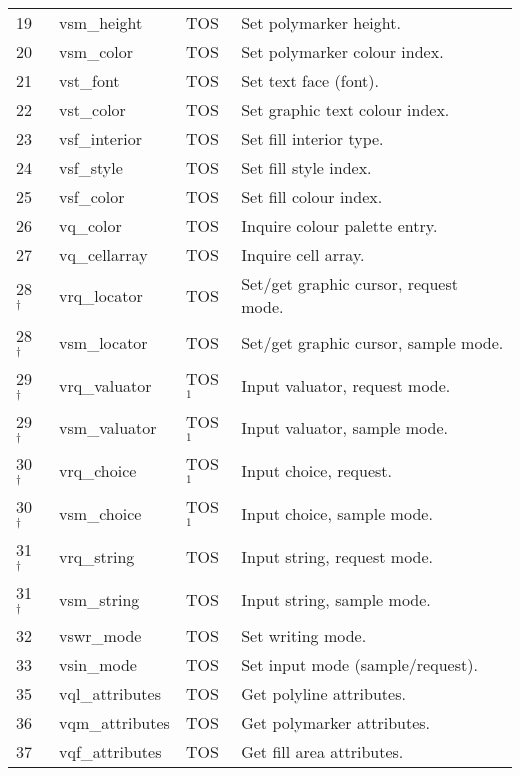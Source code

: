\documentclass[a4paper]{article}
\begin{document}
\begin{supertabular}{|p{1.8cm}|p{3.0cm}|p{1.5cm}|p{8.7cm}|}
19              & vsm\_height         & TOS   & Set polymarker height. \\
20              & vsm\_color          & TOS   & Set polymarker colour index. \\
21              & vst\_font           & TOS   & Set text face (font). \\
22              & vst\_color          & TOS   & Set graphic text colour index. \\
23              & vsf\_interior       & TOS   & Set fill interior type. \\
24              & vsf\_style          & TOS   & Set fill style index. \\
25              & vsf\_color          & TOS   & Set fill colour index. \\
26              & vq\_color           & TOS   & Inquire colour palette entry. \\
27              & vq\_cellarray       & TOS   & Inquire cell array. \\
28 $^\dag$      & vrq\_locator        & TOS   & Set/get graphic cursor, request mode. \\
28 $^\dag$      & vsm\_locator        & TOS   & Set/get graphic cursor, sample mode. \\
29 $^\dag$      & vrq\_valuator       & TOS$^1$       & Input valuator, request mode. \\
29 $^\dag$      & vsm\_valuator       & TOS$^1$       & Input valuator, sample mode. \\
30 $^\dag$      & vrq\_choice         & TOS$^1$       & Input choice, request. \\
30 $^\dag$      & vsm\_choice         & TOS$^1$       & Input choice, sample mode. \\
31 $^\dag$      & vrq\_string         & TOS   & Input string, request mode. \\
31 $^\dag$      & vsm\_string         & TOS   & Input string, sample mode. \\
32              & vswr\_mode          & TOS   & Set writing mode. \\
33              & vsin\_mode          & TOS   & Set input mode (sample/request). \\
35              & vql\_attributes     & TOS   & Get polyline attributes. \\
36              & vqm\_attributes     & TOS   & Get polymarker attributes. \\
37              & vqf\_attributes     & TOS   & Get fill area attributes. \\

\end{supertabular}
\end{document}
